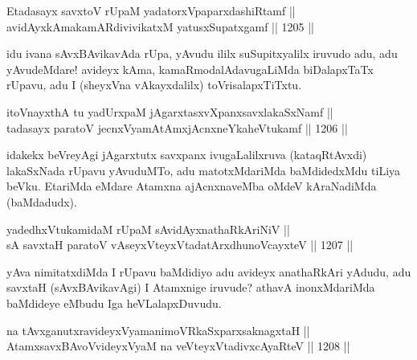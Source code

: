 
\begin{shl}
Etadasayx savxtoV rUpaM yadatorxVpaparxdashiRtamf || \\
avidAyxkAmakamARdivivikatxM yatusxSupatxgamf ||  1205 ||  
\end{shl}

\begin{artha}
idu ivana sAvxBAvikavAda rUpa, yAvudu ililx suSupitxyalilx iruvudo adu, adu yAvudeMdare! avideyx kAma, kamaRmodalAdavugaLiMda biDalapxTaTx rUpavu, adu I (sheyxVna vAkayxdalilx) toVrisalapxTiTxtu.
\end{artha}

\begin{shl}
itoV\s nayxthA tu yadUrxpaM jAgarxtasxvXpanxsavxlakaSxNamf || \\
tadasayx paratoV jecnxVyamAtAmxjAcnxneYkaheVtukamf ||  1206 ||  
\end{shl}

\begin{artha}
idakekx beVreyAgi jAgarxtutx savxpanx ivugaLalilxruva (kataqRtAvxdi) lakaSxNada rUpavu yAvuduMTo, adu matotxMdariMda baMdidedxMdu  tiLiya beVku. EtariMda eMdare Atamxna ajAcnxnaveMba oMdeV kAraNadiMda (baMdadudx).
\end{artha}


\begin{shl}
yadedhxVtukamidaM rUpaM sA\s vidAyx\s nathaRkAriNiV || \\
sA savxtaH paratoV vA\s seyxVteyxVtadatArxdhunoVcayxteV ||  1207 ||  
\end{shl}

\begin{artha}
yAva nimitatxdiMda I rUpavu baMdidiyo adu avideyx anathaRkAri yAdudu, adu savxtaH (sAvxBAvikavAgi) I Atamxnige iruvude? athavA inonxMdariMda baMdideye eMbudu Iga heVLalapxDuvudu.
\end{artha}

\begin{shl}
na tAvxganutxravideyxVyamanimoVRkaSxparxsaknagxtaH || \\
AtamxsavxBAvoV\s videyxVyaM na veVteyxVtadivxcAyaRteV ||  1208 ||  
\end{shl}

